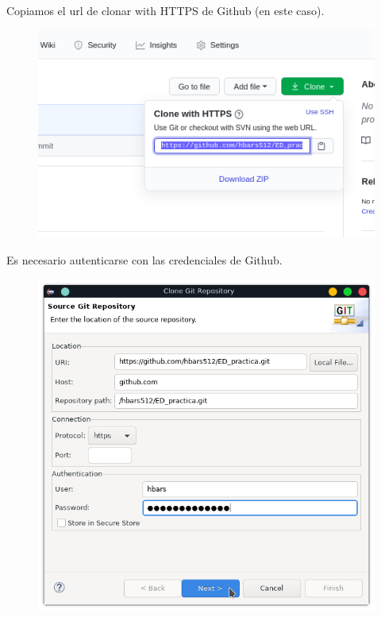 \documentclass{article}
\begin{document}
Copiamos el url de clonar with HTTPS de Github (en este caso).

\begin{figure}[h!]
  \centering
  \includegraphics[scale=0.75]{./Pictures/013_link_clone.png}
\end{figure}

\newpage

Es necesario autenticarse con las credenciales de Github.

\begin{figure}[h!]
  \centering
  \includegraphics[scale=0.75]{./Pictures/014_source_git_repository.png}
\end{figure}
\end{document}
